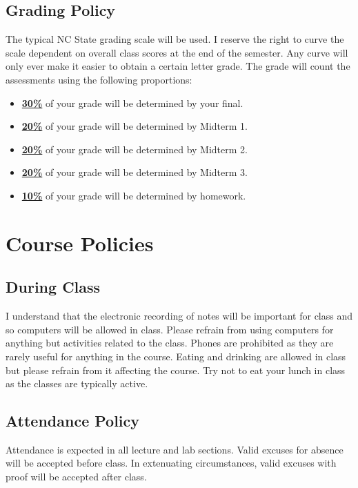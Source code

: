 \documentclass[11pt]{article}
\begin{document}
\subsection*{Grading Policy}
The typical NC State grading scale will be used. I reserve the right to curve the scale dependent on overall class scores at the end of the semester. Any curve will only ever make it easier to obtain a certain letter grade. The grade will count the assessments using the following proportions:
\begin{itemize}
	\item \underline{\textbf{30\%}} of your grade will be determined by your final.
	\item \underline{\textbf{20\%}} of your grade will be determined by Midterm 1.
	\item \underline{\textbf{20\%}} of your grade will be determined by Midterm 2.
    \item \underline{\textbf{20\%}} of your grade will be determined by Midterm 3.
	\item \underline{\textbf{10\%}} of your grade will be determined by homework.

\end{itemize}



\newpage
\section*{Course Policies}

\subsection*{During Class}
\footnotesize{I understand that the electronic recording of notes will be important for class and so computers will be allowed in class. Please refrain from using computers for anything but activities related to the class. Phones are prohibited as they are rarely useful for anything in the course. Eating and drinking are allowed in class but please refrain from it affecting the course. Try not to eat your lunch in class as the classes are typically active.}

\subsection*{Attendance Policy}
\footnotesize{Attendance is expected in all lecture and lab sections. Valid excuses for absence will be accepted before class. In extenuating circumstances, valid excuses with proof will be accepted after class. }
\end{document}

